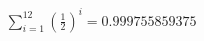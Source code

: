 \documentclass[preview]{standalone}
\begin{document}
\begin{align*}
\sum_{i=1}^{12} \left(\frac{1}{2}\right)^i = {0.999755859375}
\end{align*}
\end{document}
